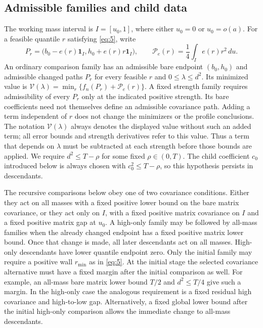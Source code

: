 \subsection{Admissible families and child data}

\begin{definition}\label{reg:families}
The working mass interval is $I=[u_0,1]$, where either $u_0=0$ or
$u_0=o(a)$.  For a feasible quantile $r$ satisfying \eqref{eq:5}, write
\[
 P_r=\bigl(b_0-e(r)\mathbf 1_I,
                 h_0+e(r)r\mathbf 1_I\bigr),\qquad
 \mathcal P_e(r)=\frac14\int_I e(r)r^2\,du.
\]
An ordinary comparison family has an admissible bare endpoint
$(b_0,h_0)$ and admissible changed paths $P_r$ for every feasible $r$
and $0\le\lambda\le d^2$.  Its minimized value is
$\mathcal V(\lambda)=\min_r\{f_n(P_r)+\mathcal P_e(r)\}$.
A fixed strength family requires admissibility of every $P_r$ only
at the indicated positive strength.  Its bare coefficients need not
themselves define an admissible covariance path.  Adding a term
independent of $r$ does not change the minimizers or the profile
conclusions.  The notation $\mathcal V(\lambda)$ always denotes the
displayed value without such an added term; all error bounds and
strength derivatives refer to this value.  Thus a term that depends
on $\lambda$ must be subtracted at each strength before those bounds
are applied.
We require $d^2\le T-\rho$ for some fixed $\rho\in(0,T)$.
The child coefficient $c_0$ introduced below is always chosen with
$c_0^2\le T-\rho$, so this hypothesis persists in descendants.

The recursive comparisons below obey one of two covariance conditions.
Either they act on all masses with a fixed positive lower bound on
the bare matrix covariance, or they act only on $I$, with a fixed
positive matrix covariance on $I$ and a fixed positive matrix gap
at $u_0$.  A high-only family may be followed by all-mass families
when the already changed endpoint has a fixed positive matrix lower
bound.  Once that change is made, all later descendants act on all
masses.  High-only descendants have lower quantile endpoint zero.
Only the initial family may require a positive wall
$r_{\min}$ as in \eqref{eq:5}.
At the initial stage the selected covariance alternative must have
a fixed margin after the initial comparison as well.  For example,
an all-mass bare matrix lower bound $T/2$ and $d^2\le T/4$ give
such a margin.  In the high-only case the analogous requirement is
a fixed residual high covariance and high-to-low gap.  Alternatively,
a fixed global lower bound after the initial high-only comparison
allows the immediate change to all-mass descendants.
\end{definition}


